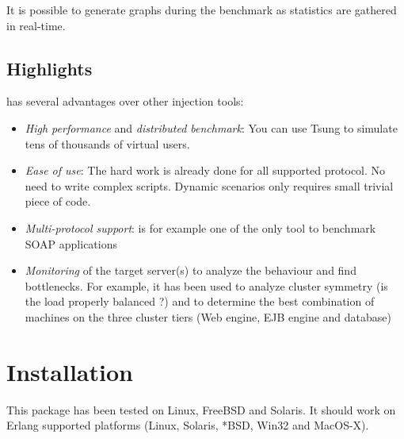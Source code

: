 \documentclass{IDXDOC-en}
\begin{document}
 It is possible to generate graphs during the benchmark as statistics
are gathered in real-time.

\subsection{Highlights}

 has several advantages over other injection tools:


\begin{itemize}
\item \emph{High performance} and \emph{distributed benchmark}: You
  can use Tsung to simulate tens of thousands of virtual users.
\item \emph{Ease of use}: The hard work is already done for all supported
protocol. No need to write complex scripts. Dynamic scenarios only
requires small trivial piece of code.
\item \emph{Multi-protocol support}:  is for example one of
the only tool to benchmark SOAP applications
\item \emph{Monitoring} of the target server(s) to analyze the behaviour
and find bottlenecks. For example, it has been used to analyze cluster
symmetry (is the load properly balanced ?) and to determine the best
combination of machines on the three cluster tiers (Web engine, EJB
engine and database)
\end{itemize}



\section{Installation}

This package has been tested on Linux, FreeBSD and Solaris. It should
work on Erlang supported platforms (Linux, Solaris, *BSD, Win32 and
MacOS-X).
\end{document}
